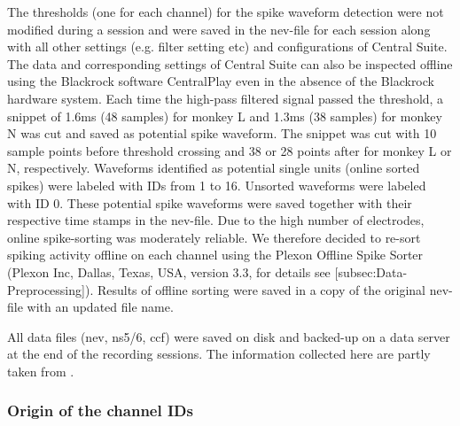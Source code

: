 {The thresholds (one for each channel) for the spike waveform detection were not modified during a session and were saved in the nev-file for each session along with all other settings (e.g. filter setting etc) and configurations of Central Suite. The data and corresponding settings of Central Suite can also be inspected offline using the Blackrock software CentralPlay even in the absence of the Blackrock hardware system. Each time the high-pass filtered signal passed the threshold, a snippet of 1.6ms (48 samples) for monkey L and 1.3ms (38 samples) for monkey N was cut and saved as potential spike waveform. The snippet was cut with 10 sample points before threshold crossing and 38 or 28 points after for monkey L or N, respectively. Waveforms identified as potential single units (online sorted spikes) were labeled with IDs from 1 to 16. Unsorted waveforms were labeled with ID 0. These potential spike waveforms were saved together with their respective time stamps in the nev-file. Due to the high number of electrodes, online spike-sorting was moderately reliable. We therefore decided to re-sort spiking activity offline on each channel using the Plexon Offline Spike Sorter (Plexon Inc, Dallas, Texas, USA, version 3.3, for details see [subsec:Data-Preprocessing]). Results of offline sorting were saved in a copy of the original nev-file with an updated file name. 

All data files (nev, ns5/6, ccf) were saved on disk and backed-up on a data server at the end of the recording sessions. The information collected here are partly taken from \citep{Riehle_2013, Zehl_2016}.


\subsubsection{Origin of the channel IDs}

}
